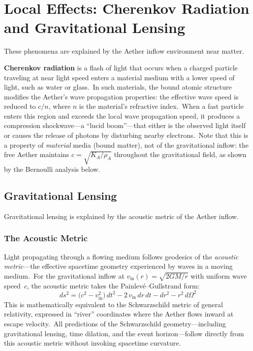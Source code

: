 ﻿\documentclass[12pt,letterpaper]{article}
\newcommand{\rhoa}{\rho_{\!A}}
\newcommand{\Ka}{K_{\!A}}
\newcommand{\vin}{v_{\mathrm{in}}}
\begin{document}
\section{Local Effects: Cherenkov Radiation and Gravitational Lensing}
\label{sec:local-effects}

These phenomena are explained by the Aether inflow environment near matter.

\textbf{Cherenkov radiation} is a flash of light that occurs when a charged particle
traveling at near light speed enters a material medium with a lower speed of light, such
as water or glass.\ In such materials, the bound atomic structure modifies the Aether's
wave propagation properties: the effective wave speed is reduced to $c/n$, where $n$
is the material's refractive index.\ When a fast particle enters this region and exceeds
the local wave propagation speed, it produces a compression shockwave---a ``lucid
boom''---that either is the observed light itself or causes the release of photons by
disturbing nearby electrons.\ Note that this is a property of \emph{material} media (bound
matter), not of the gravitational inflow: the free Aether maintains $c = \sqrt{\Ka/\rhoa}$
throughout the gravitational field, as shown by the Bernoulli analysis below.


\subsection{Gravitational Lensing}
\label{sec:lensing}

Gravitational lensing is explained by the acoustic metric of the Aether inflow.

\subsubsection{The Acoustic Metric}

Light propagating through a flowing medium follows geodesics of the \emph{acoustic
metric}---the effective spacetime geometry experienced by waves in a moving medium.\
For the gravitational inflow at $\vin(r) = \sqrt{2GM/r}$ with uniform wave speed~$c$,
the acoustic metric takes the Painlev\'e--Gullstrand form:
%
\begin{equation}
  ds^2 = \bigl(c^2 - \vin^2\bigr)\,dt^2
    - 2\,\vin\,dr\,dt - dr^2 - r^2\,d\Omega^2
\end{equation}
%
This is mathematically equivalent to the Schwarzschild metric of general relativity,
expressed in ``river'' coordinates where the Aether flows inward at escape velocity.\
All predictions of the Schwarzschild geometry---including gravitational lensing, time
dilation, and the event horizon---follow directly from this acoustic metric without
invoking spacetime curvature.
\end{document}
